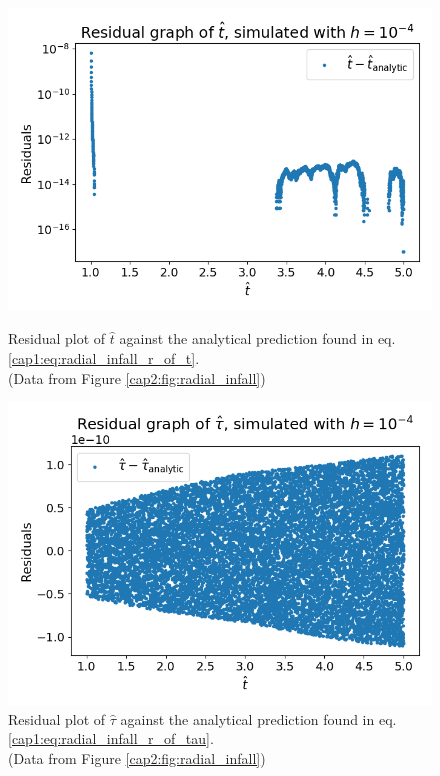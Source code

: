 \begin{figure}[h]
    \begin{minipage}{0.48\textwidth}
        \centering
        \includegraphics[width=\textwidth]{Figures/chapter2/t_res.png}
        \caption{Residual plot of $\hat t$ against the analytical prediction
        found in eq. \ref{cap1:eq:radial_infall_r_of_t}. \\
        (Data from Figure \ref{cap2:fig:radial_infall})}
        \label{cap2:fig:t_res}
    \end{minipage}
    \hspace{0.015 \textwidth}
    \begin{minipage}{0.48\textwidth}
        \centering
        \includegraphics[width=\textwidth]{Figures/chapter2/tau_res.png}
        \caption{Residual plot of $\hat \tau$ against the analytical prediction
        found in eq. \ref{cap1:eq:radial_infall_r_of_tau}. \\
        (Data from Figure \ref{cap2:fig:radial_infall})}
        \label{cap2:fig:tau_res}
    \end{minipage}
\end{figure}

